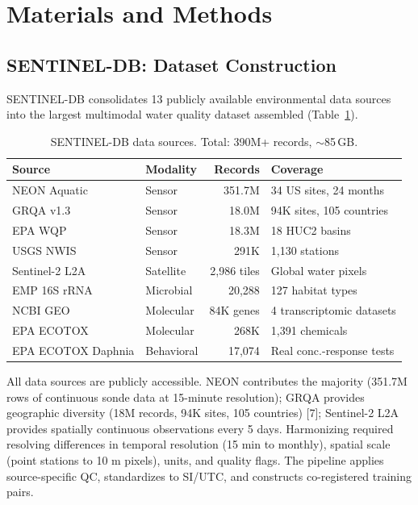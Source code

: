 \documentclass[12pt]{article}
\begin{document}
\section{Materials and Methods}

\subsection{SENTINEL-DB: Dataset Construction}

SENTINEL-DB consolidates 13 publicly available environmental data sources into the largest multimodal water quality dataset assembled (Table~\ref{tab:dataset}).

\begin{table}[H]
\centering
\caption{SENTINEL-DB data sources. Total: 390M+ records, $\sim$85\,GB.}
\label{tab:dataset}
\small
\begin{tabular}{llrl}
\toprule
\textbf{Source} & \textbf{Modality} & \textbf{Records} & \textbf{Coverage} \\
\midrule
NEON Aquatic & Sensor & 351.7M & 34 US sites, 24 months \\
GRQA v1.3 & Sensor & 18.0M & 94K sites, 105 countries \\
EPA WQP & Sensor & 18.3M & 18 HUC2 basins \\
USGS NWIS & Sensor & 291K & 1,130 stations \\
Sentinel-2 L2A & Satellite & 2,986 tiles & Global water pixels \\
EMP 16S rRNA & Microbial & 20,288 & 127 habitat types \\
NCBI GEO & Molecular & 84K genes & 4 transcriptomic datasets \\
EPA ECOTOX & Molecular & 268K & 1,391 chemicals \\
EPA ECOTOX Daphnia & Behavioral & 17,074 & Real conc.-response tests \\
\bottomrule
\end{tabular}
\end{table}

All data sources are publicly accessible. NEON contributes the majority (351.7M rows of continuous sonde data at 15-minute resolution); GRQA provides geographic diversity (18M records, 94K sites, 105 countries) [7]; Sentinel-2 L2A provides spatially continuous observations every 5 days. Harmonizing required resolving differences in temporal resolution (15 min to monthly), spatial scale (point stations to 10 m pixels), units, and quality flags. The pipeline applies source-specific QC, standardizes to SI/UTC, and constructs co-registered training pairs.
\end{document}
